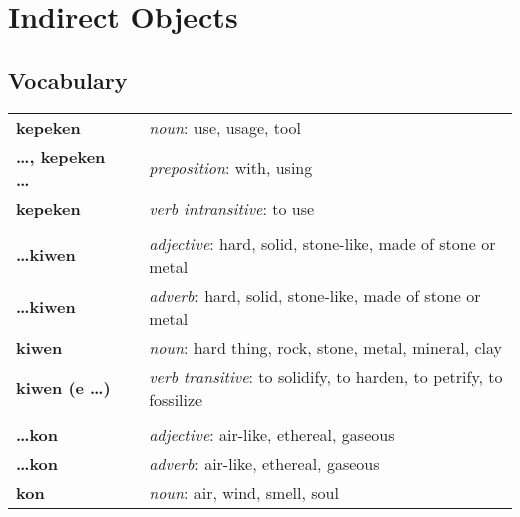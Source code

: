 
\section{Indirect Objects}
\subsection*{Vocabulary}
\begin{supertabular}{p{2,5cm}|ll}
    \textbf{kepeken}               &  & \textit{noun}: use, usage, tool                                                             \\
    \textbf{\dots , kepeken \dots} &  & \textit{preposition}: with, using                                                           \\
    \textbf{kepeken}               &  & \textit{verb intransitive}: to use                                                          \\
                                   &  &                                                                                             \\
    \textbf{\dots kiwen}           &  & \textit{adjective}: hard, solid, stone-like, made of stone or metal                         \\
    \textbf{\dots kiwen}           &  & \textit{adverb}: hard, solid, stone-like, made of stone or metal                            \\
    \textbf{kiwen}                 &  & \textit{noun}: hard thing, rock, stone, metal, mineral, clay                                \\
    \textbf{kiwen (e \dots)}       &  & \textit{verb transitive}: to solidify, to harden, to petrify, to fossilize                  \\
                                   &  &                                                                                             \\
    \textbf{\dots kon}             &  & \textit{adjective}: air-like, ethereal, gaseous                                             \\
    \textbf{\dots kon}             &  & \textit{adverb}: air-like, ethereal, gaseous                                                \\
    \textbf{kon}                   &  & \textit{noun}: air, wind, smell, soul                                                       \\

\end{supertabular}
